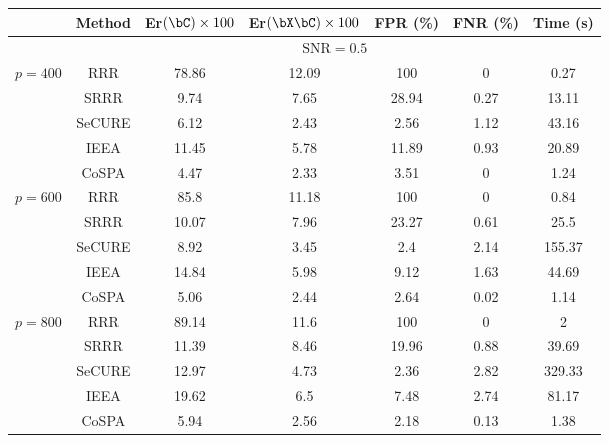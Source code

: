 \begin{tabular}{lcccccc} 
\toprule 
& Method & Er$(\bC)\times 100$ & Er$(\bX\bC)\times 100$ & FPR (\%) & FNR (\%) & Time (s) \\ 
\midrule 
 & \multicolumn{6}{c}{$\text{SNR}=0.5$} \\ 
\multirow{5}{*}{$p=400$} & RRR & 78.86 & 12.09 & 100 & 0 & 0.27 \\ 
 & SRRR & 9.74 & 7.65 & 28.94 & 0.27 & 13.11 \\ 
 & SeCURE & 6.12 & 2.43 & 2.56 & 1.12 & 43.16 \\ 
 & IEEA & 11.45 & 5.78 & 11.89 & 0.93 & 20.89 \\ 
 & CoSPA & 4.47 & 2.33 & 3.51 & 0 & 1.24 \\ 
\hline 
\multirow{5}{*}{$p=600$} & RRR & 85.8 & 11.18 & 100 & 0 & 0.84 \\ 
 & SRRR & 10.07 & 7.96 & 23.27 & 0.61 & 25.5 \\ 
 & SeCURE & 8.92 & 3.45 & 2.4 & 2.14 & 155.37 \\ 
 & IEEA & 14.84 & 5.98 & 9.12 & 1.63 & 44.69 \\ 
 & CoSPA & 5.06 & 2.44 & 2.64 & 0.02 & 1.14 \\ 
\hline 
\multirow{5}{*}{$p=800$} & RRR & 89.14 & 11.6 & 100 & 0 & 2 \\ 
 & SRRR & 11.39 & 8.46 & 19.96 & 0.88 & 39.69 \\ 
 & SeCURE & 12.97 & 4.73 & 2.36 & 2.82 & 329.33 \\ 
 & IEEA & 19.62 & 6.5 & 7.48 & 2.74 & 81.17 \\ 
 & CoSPA & 5.94 & 2.56 & 2.18 & 0.13 & 1.38 \\ 
\bottomrule 
\end{tabular} 
